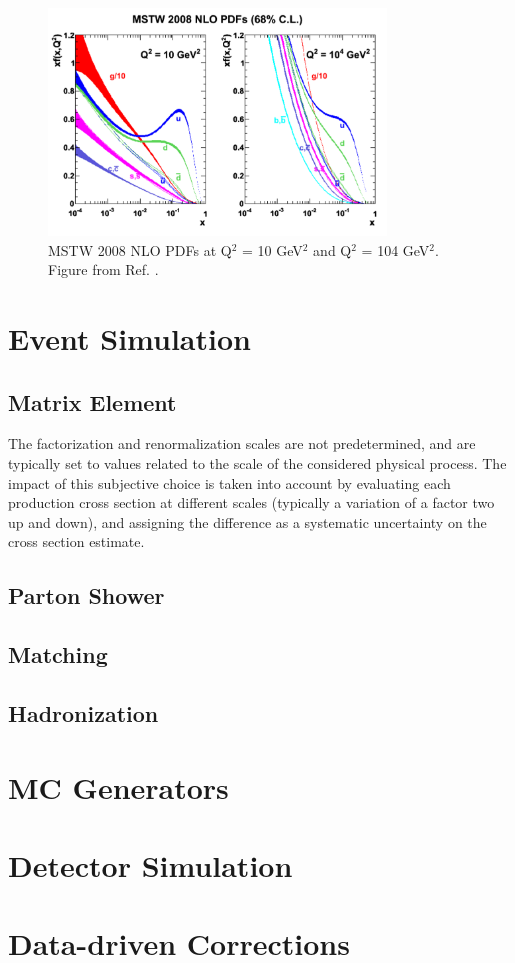 \begin{figure}[h]
\begin{center}
    \includegraphics[width=0.8\textwidth]{figures/simul/pdf}
\end{center}
\caption{MSTW 2008 NLO PDFs at Q$^2$ = 10 GeV$^2$ and Q$^2$ = 104 GeV$^2$. Figure from Ref. \cite{Martin:2009iq}.}
 \label{fig:sim:pp}
\end{figure}


\section{Event Simulation}
\label{sec:eventsimul}

\subsection{Matrix Element}

The factorization and renormalization scales are not predetermined, and are typically set to values related to the scale of the considered physical process. 
The impact of this subjective choice is taken into account by evaluating each production cross section at different scales (typically a variation of a factor two up and down), and assigning the difference as a systematic uncertainty on the cross section estimate.

\subsection{Parton Shower}

\subsection{Matching}

\subsection{Hadronization}

\section{MC Generators}

\section{Detector Simulation}

\section{Data-driven Corrections}
